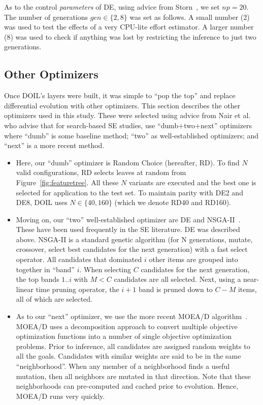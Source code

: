 \documentclass[10pt,conference]{IEEEtran}
\newcommand{\bi}{\begin{itemize}}
\newcommand{\ei}{\end{itemize}}
\newcommand{\fig}[1]{Figure~\ref{fig:#1}}
\begin{document}
As to the control {\em parameters} of DE,  using advice from Storn~\cite{storn1997differential}, we set $\mathit{np}=20$. 
The number of generations $\mathit{gen}\in\{2,8\}$ was set as follows. A   small number (2) was used to test
the effects of  a very   CPU-lite    effort estimator. A  larger number (8) was used to check if anything was
lost by restricting the inference to just two generations.




\subsection{Other Optimizers}
Once DOIL's layers were  built, it was simple  to ``pop the top'' and replace differential evolution with
other optimizers. This section describes the other optimizers used in this study. These were selected
using advice from Nair et al.~\cite{nair18} who advise that for search-based SE studies,
use ``dumb+two+next''  optimizers where ``dumb'' is some baseline method;
``two'' as well-established optimizers;  and ``next'' is a more recent method.
\bi
\item
Here, our  ``dumb'' optimizer is  Random Choice (hereafter, RD). To find $N$ valid configurations, RD
selects leaves at random from \fig{featuretree}.
All these $N$ variants are executed and the best one is selected for application to the test set. To maintain parity with   DE2 and DE8, DOIL uses  $N\in\{40,160\}$ (which we denote RD40 and RD160). 
\item
Moving on, our ``two'' well-established optimizer are DE and NSGA-II~\cite{deb02}. These have been used frequently in the SE literature\cite{Fu2016TuningFS,AGRAWAL2018,agrawal2017better,sayyad2013value,sayyad2013pareto}. 
DE was described above. NSGA-II is a standard genetic algorithm  (for N generations, mutate, crossover, select best candidates  for the next generation) with a fast   select operator. 
All candidates that dominated $i$ other items are grouped into together in ``band'' $i$.
When selecting $C$ candidates for the next generation, the top bands $1..i$ with $M< C$ candidates
are all selected.  Next, using a  near-linear time pruning operator, the $i+1$ band is pruned down to $C-M$ items, all of which are selected.
 \item
As to our ``next'' optimizer, we use the more recent MOEA/D algorithm~\cite{Zhang07}.
MOEA/D uses a  decomposition approach to convert multiple objective
optimization functions
into a number of single objective optimization problems.  Prior to inference,
all candidates are assigned random weights to all the goals. Candidates
with similar weights are said to be in the same ``neighborhood''. When any member
of a neighborhood finds a useful mutation, then all  neighbors are  mutated
in that direction. Note that  these neighborhoods can pre-computed and cached
prior to evolution. Hence, MOEA/D runs very quickly.
\ei
\end{document}
